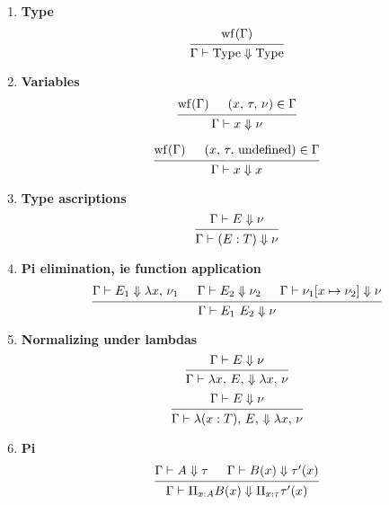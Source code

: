 \documentclass{article}
\begin{document}
\begin{enumerate}
\item \textbf{Type}
  \[
    \begin{prooftree}
      \hypo{\wf(\Gamma)}
      \infer1{\Gamma \vdash \Type \Downarrow \Type} 
    \end{prooftree}
  \]
\item \textbf{Variables} \\
  \[
    \begin{prooftree}
      \hypo{\wf(\Gamma)}
      \hypo{(x, \, \tau, \, \nu) \in \Gamma}
      \infer2{\Gamma \vdash x \Downarrow \nu}
    \end{prooftree} 
  \]

  \[
    \begin{prooftree}
      \hypo{\wf(\Gamma)}
      \hypo{(x, \, \tau, \, \text{undefined}) \in \Gamma}
      \infer2{\Gamma \vdash x \Downarrow x}
    \end{prooftree} 
  \]

\item \textbf{Type ascriptions} \\
  \[
    \begin{prooftree}
      \hypo{\Gamma \vdash E \Downarrow \nu}
      \infer1{\Gamma \vdash (E : T) \Downarrow \nu}
    \end{prooftree}
  \]
  
\item \textbf{Pi elimination, ie function application} \\
  \[
    \begin{prooftree}
      \hypo{\Gamma \vdash E_1 \Downarrow \lambda x, \, \nu_1}
      \hypo{\Gamma \vdash E_2 \Downarrow \nu_2}
      \hypo{\Gamma \vdash \nu_1[x \mapsto \nu_2] \Downarrow \nu}
      \infer3{\Gamma \vdash E_1 \,\, E_2 \Downarrow \nu}
    \end{prooftree}
  \]

\item \textbf{Normalizing under lambdas} \\
  \[
    \begin{prooftree}
      \hypo{\Gamma \vdash E \Downarrow \nu}
      \infer1{\Gamma \vdash \lambda x, \, E, \, \Downarrow \lambda x, \, \nu}
    \end{prooftree}
  \]
  \[
    \begin{prooftree}
      \hypo{\Gamma \vdash E \Downarrow \nu}
      \infer1{\Gamma \vdash \lambda (x : T), \, E, \, \Downarrow \lambda x, \, \nu}
    \end{prooftree}
  \]

\item \textbf{Pi} \\
  \[
    \begin{prooftree}
      \hypo{\Gamma \vdash A \Downarrow \tau}
      \hypo{\Gamma \vdash B(x) \Downarrow \tau'(x)}
      \infer2{\Gamma \vdash \Pi_{x : A} B(x) \Downarrow \Pi_{x : \tau} \tau'(x)}
    \end{prooftree}
  \]
\end{enumerate}
\end{document}
